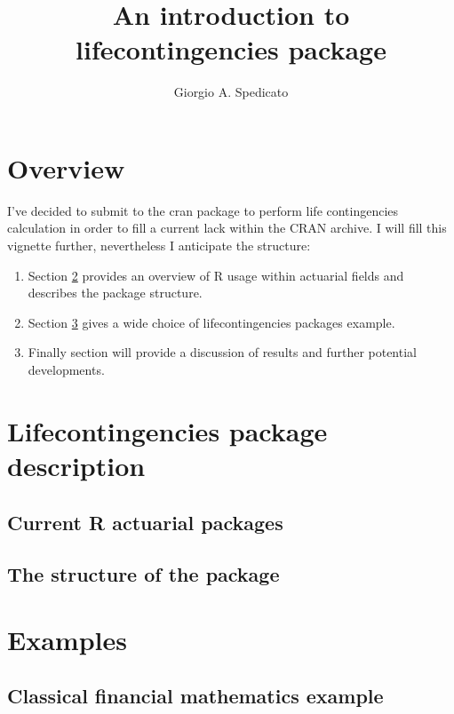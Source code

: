 \documentclass[a4paper]{article}
\begin{document}
\title{An introduction to lifecontingencies package}
\author{Giorgio A. Spedicato}

\maketitle

\section{Overview}
I've decided to submit to the cran package to perform life contingencies calculation in order to fill a current
lack within the CRAN archive. I will fill this  vignette further, nevertheless I anticipate the structure:

\begin{enumerate}
	\item Section \ref{sec:package} provides an overview of R usage within actuarial 
	fields and describes the package structure.
	\item Section \ref{sec:examples} gives a wide choice of lifecontingencies packages example.
	\item Finally section \label{sec:discussion} will provide a discussion of results and further potential
	developments.

\end{enumerate}

\section{Lifecontingencies package description} \label{sec:package}

\subsection{Current R actuarial packages}


\subsection{The structure of the package}

\clearpage
\newpage


\section{Examples} \label{sec:examples}

\subsection{Classical financial mathematics example}
\end{document}
